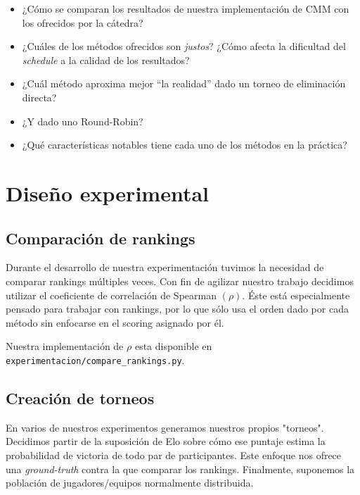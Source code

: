 \documentclass[a4paper]{article}
\begin{document}
\begin{itemize}
    \item ¿Cómo se comparan los resultados de nuestra implementación de CMM con los ofrecidos por la cátedra?

    \item ¿Cuáles de los métodos ofrecidos son \textit{justos}? ¿Cómo afecta la dificultad del \textit{schedule} a la calidad de los resultados?
    
    \item ¿Cuál método aproxima mejor ``la realidad'' dado un torneo de eliminación directa?
    \item ¿Y dado uno Round-Robin?

    \item ¿Qué características notables tiene cada uno de los métodos en la práctica?

\end{itemize}

\section{Diseño experimental} \label{sec:disenio-experimental}

\subsection{Comparación de rankings}
Durante el desarrollo de nuestra experimentación tuvimos la necesidad de comparar rankings múltiples veces. Con fin de agilizar nuestro trabajo decidimos utilizar el coeficiente de correlación de Spearman $(\rho)$. Éste está especialmente pensado para trabajar con rankings, por lo que sólo usa el orden dado por cada método sin enfocarse en el scoring asignado por él.

Nuestra implementación de $\rho$ esta disponible en \texttt{experimentacion/compare\_rankings.py}.

\subsection{Creación de torneos}
En varios de nuestros experimentos generamos nuestros propios "torneos". Decidimos partir de la suposición de Elo sobre cómo ese puntaje estima la probabilidad de victoria de todo par de participantes. Este enfoque nos ofrece una \textit{ground-truth} contra la que comparar los rankings. Finalmente, suponemos la población de jugadores/equipos normalmente distribuida.
\end{document}
